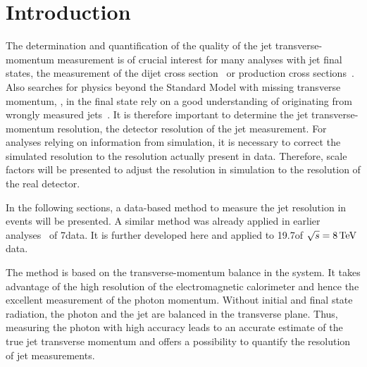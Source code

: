\chapter{Introduction}
\label{res:ch:Introduction}
The determination and quantification of the quality of the jet transverse-momentum measurement is of crucial interest for many analyses with jet final states, \eg the measurement of the dijet cross section~\cite{bib:CMS:QCD_measurements} or \ttbar production cross sections~\cite{bib:CMS:TopCrossSection_8TeV}. 
Also searches for physics beyond the Standard Model with missing transverse momentum, \PTm, in the final state rely on a good understanding of \PTm originating from wrongly measured jets~\cite{bib:CMS:RA2_8TeV,bib:CMS:MT2_8TeV,bib:CMS:AlphaT_8TeV}.
It is therefore important to determine the jet transverse-momentum resolution, \ie the detector resolution of the jet \pt measurement.
For analyses relying on information from simulation, it is necessary to correct the simulated resolution to the resolution actually present in data.
Therefore, scale factors will be presented to adjust the resolution in simulation to the resolution of the real detector.  
  
In the following sections, a data-based method to measure the jet \pt resolution in \GAMJET events will be presented. 
A similar method was already applied in earlier analyses~\cite{bib:CMS:JERCPaper_2011,CMS:PAS:JETResolution_7TeV} of 7\tev data.  
It is further developed here and applied to 19.7\fbinv of $\sqrt{s}=8\,\text{Te}\kern-0.06667em\text{V}$ data.

The method is based on the transverse-momentum balance in the \GAMJET system. 
It takes advantage of the high resolution of the electromagnetic calorimeter and hence the excellent measurement of the photon momentum.
Without initial and final state radiation, the photon and the jet are balanced in the transverse plane. 
Thus, measuring the photon \pt with high accuracy leads to an accurate estimate of the true jet transverse momentum and offers a possibility to quantify the resolution of jet \pt measurements.


